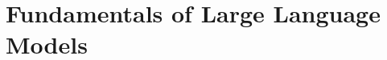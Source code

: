 \setcounter{chapter}{15}

\hypertarget{fundamentals-of-large-language-models}{%
\chapter{Fundamentals of Large Language Models}\label{fundamentals-of-large-language-models}}
